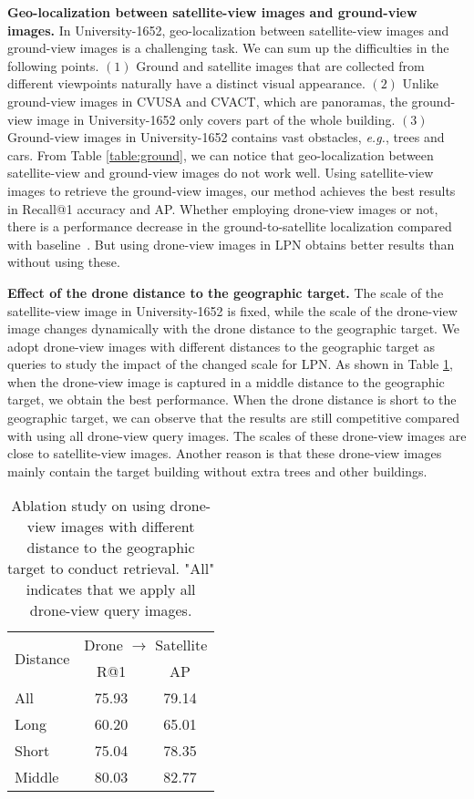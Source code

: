 \documentclass[journal]{IEEEtran}
\def\eg{\emph{e.g.}}
\begin{document}
\textbf{Geo-localization between satellite-view images and ground-view images.} In University-1652, geo-localization between satellite-view images and ground-view images is a challenging task. We can sum up the difficulties in the following points. $(1)$ Ground and satellite images that are collected from different viewpoints naturally have a distinct visual appearance. $(2)$ Unlike ground-view images in CVUSA and CVACT, which are panoramas, the ground-view image in University-1652 only covers part of the whole building. $(3)$ Ground-view images in University-1652 contains vast obstacles, \eg, trees and cars. From Table \ref{table:ground}, we can notice that geo-localization between satellite-view and ground-view images do not work well. Using satellite-view images to retrieve the ground-view images, our method achieves the best results in Recall@1 accuracy and AP. Whether employing drone-view images or not, there is a performance decrease in the ground-to-satellite localization compared with baseline~\cite{zheng_university-1652_nodate}. But using drone-view images in LPN obtains better results than without using these.
\par
\textbf{Effect of the drone distance to the geographic target.} The scale of the satellite-view image in University-1652 is fixed, while the scale of the drone-view image changes dynamically with the drone distance to the geographic target. We adopt drone-view images with different distances to the geographic target as queries to study the impact of the changed scale for LPN. As shown in Table \ref{table:scale}, when the drone-view image is captured in a middle distance to the geographic target, we obtain the best performance. When the drone distance is short to the geographic target, we can observe that the results are still competitive compared with using all drone-view query images. The scales of these drone-view images are close to satellite-view images. Another reason is that these drone-view images mainly contain the target building without extra trees and other buildings.
\par
\setlength{\tabcolsep}{28pt}
\begin{table}
\small
\caption{Ablation study on using drone-view images with different distance to the geographic target to conduct retrieval. "All" indicates that we apply all drone-view query images.
}
\begin{center}
\begin{tabular}{l|cc}
\hline
\multirow{2}{*}{Distance}& \multicolumn{2}{c}{Drone $\rightarrow$ Satellite} \\
  & R@1 & AP \\
\shline
All  & 75.93 & 79.14  \\
Long & 60.20 & 65.01 \\
Short  & 75.04 & 78.35  \\
Middle & 80.03 & 82.77  \\
\hline
\end{tabular}
\end{center}
\label{table:scale}
\end{table}
\end{document}
